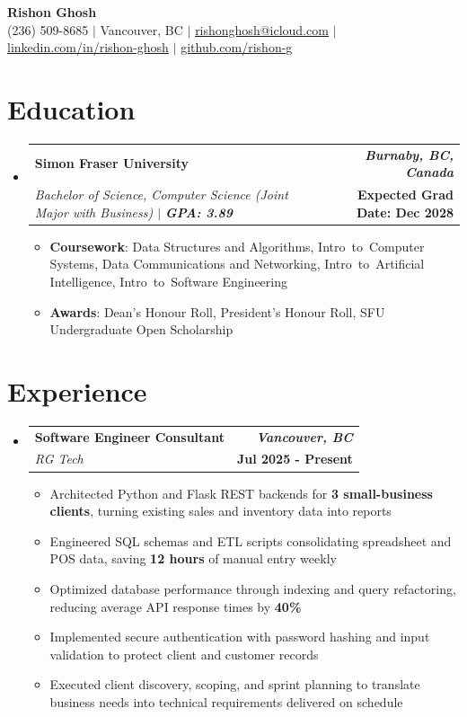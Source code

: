 \documentclass[letterpaper]{article}
\makeatletter
\newcommand{\bulletgap}{-1pt}
\newcommand{\resumeSubHeadingListStart}{\begin{itemize}[leftmargin=0.15in, label={}]}
\newcommand{\resumeSubHeadingListEnd}{\end{itemize}}
\newcommand{\resumeItemListStart}{\begin{itemize}[itemsep=\bulletgap, parsep=0pt, topsep=2pt]}
\newcommand{\resumeItemListEnd}{\end{itemize}\vspace{-2pt}}
\newcommand{\resumeItem}[1]{
  \item\small{
    {#1}\par\vspace{0pt plus 1fill}
  }
}
\newcommand{\resumeSubheading}[4]{
  \vspace{-2pt}\item
    \begin{tabular*}{0.97\textwidth}[t]{l@{\extracolsep{\fill}}r}
      \textbf{#1} & \textbf{\textit{\small#4}} \\
      \textit{\small#3} & \textbf{\small#2} \\
    \end{tabular*}\vspace{-5pt}
}
\makeatother
\begin{document}
\begin{center}
    \textbf{\Huge Rishon Ghosh} \\ \vspace{1pt}
    \small {(236) 509-8685} $|$
    \small {Vancouver, BC} $|$
    \small \href{mailto:rishonghosh@icloud.com}{{\underline{rishonghosh@icloud.com}}} $|$
    \href{https://www.linkedin.com/in/rishon-ghosh/}{\underline{linkedin.com/in/rishon-ghosh}} $|$
    \href{https://github.com/rishon-g}{{\underline{github.com/rishon-g}}}
\end{center}

\section{Education}
  \resumeSubHeadingListStart
    \resumeSubheading
      {Simon Fraser University}{Expected Grad Date: Dec 2028}
      {Bachelor of Science, Computer Science (Joint Major with Business) $|$ \textbf{GPA: 3.89}}{Burnaby, BC, Canada}
      \resumeItemListStart
        \resumeItem{\textbf{Coursework}: Data Structures and Algorithms, Intro~to~Computer Systems, Data Communications and Networking, Intro~to~Artificial Intelligence, Intro~to~Software Engineering}
        \resumeItem{\textbf{Awards}: Dean's Honour Roll, President's Honour Roll, SFU Undergraduate Open Scholarship}
      \resumeItemListEnd
  \resumeSubHeadingListEnd

\section{Experience}
  \resumeSubHeadingListStart
    \resumeSubheading
      {Software Engineer Consultant}{Jul 2025 - Present}
      {RG Tech}{Vancouver, BC}
      \resumeItemListStart
         \resumeItem{Architected Python and Flask REST backends for \textbf{3 small-business clients}, turning existing sales and inventory data into reports}
         \resumeItem{Engineered SQL schemas and ETL scripts consolidating spreadsheet and POS data, saving \textbf{12 hours} of manual entry weekly}
         \resumeItem{Optimized database performance through indexing and query refactoring, reducing average API response times by \textbf{40\%}}
         \resumeItem{Implemented secure authentication with password hashing and input validation to protect client and customer records}
         \resumeItem{Executed client discovery, scoping, and sprint planning to translate business needs into technical requirements delivered on schedule}
    \resumeItemListEnd
  \resumeSubHeadingListEnd
    
\end{document}
